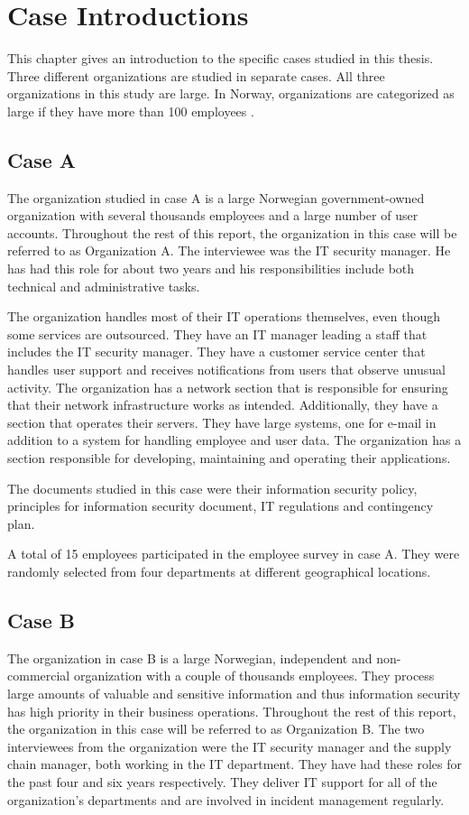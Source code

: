 \chapter{Case Introductions}
\label{chp:CaseIntroductions}
This chapter gives an introduction to the specific cases studied in this thesis. Three  different organizations are studied in separate cases. All three organizations in this study are large. In Norway, organizations are categorized as large if they have more than 100 employees \cite{SMB}. 

\section{Case A}
The organization studied in case A is a large Norwegian government-owned organization with several thousands employees and a large number of user accounts. Throughout the rest of this report, the organization in this case will be referred to as Organization A. The interviewee was the IT security manager. He has had this role for about two years and his responsibilities include both technical and administrative tasks. 

The organization handles most of their IT operations themselves, even though some services are outsourced. They have an IT manager leading a staff that includes the IT security manager. They have a customer service center that handles user support and receives notifications from users that observe unusual activity. The organization has a network section that is responsible for ensuring that their network infrastructure works as intended. Additionally, they have a section that operates their servers. They have large systems, one for e-mail in addition to a system for handling employee and user data. The organization has a section responsible for developing, maintaining and operating their applications.

The documents studied in this case were their information security policy, principles for information security document, IT regulations and contingency plan.

A total of 15 employees participated in the employee survey in case A. They were randomly selected from four departments at different geographical locations. 

\section{Case B}
The organization in case B is a large Norwegian, independent and non-commercial organization with a couple of thousands employees. They process large amounts of valuable and sensitive information and thus information security has high priority in their business operations. Throughout the rest of this report, the organization in this case will be referred to as Organization B. The two interviewees from the organization were the IT security manager and the supply chain manager, both working in the IT department. They have had these roles for the past four and six years respectively. They deliver IT support for all of the organization's departments and are involved in incident management regularly.   

